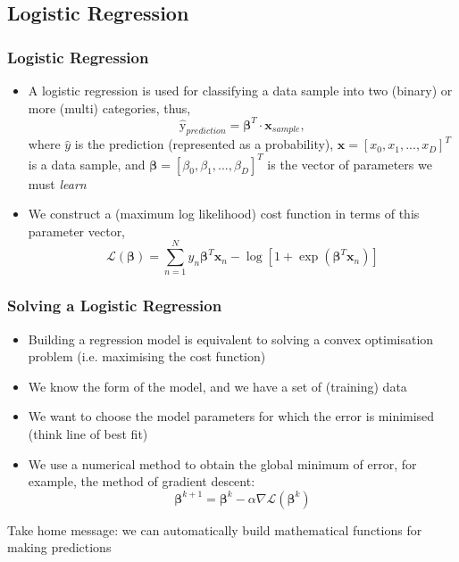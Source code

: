 \documentclass{beamer}
\begin{document}
\subsection{Logistic Regression}
\begin{frame}
\frametitle{Logistic Regression}
\begin{itemize}
\item A logistic regression is used for classifying a data sample into two (binary) or more (multi) categories, thus,
$$\hat{\text{y}}_{prediction} = \boldsymbol\beta^{T} \cdot \boldsymbol{x}_{sample},$$
where $\hat{y}$ is the prediction (represented as a probability), $\boldsymbol{x} = [x_0, x_1, ..., x_D]^T$ is a data sample, and $\boldsymbol\beta = [\beta_0, \beta_1, ..., \beta_D]^T$ is the vector of parameters we must \emph{learn}
\item We construct a (maximum log likelihood) cost function in terms of this parameter vector,
$$\mathcal{L}(\boldsymbol\beta) = \sum_{n=1}^N y_n\boldsymbol\beta^T\boldsymbol{x}_n - \log[1 + \exp(\boldsymbol\beta^T\boldsymbol{x}_n)]$$
\end{itemize}
\end{frame}


\begin{frame}
\frametitle{Solving a Logistic Regression}\begin{itemize}
\item Building a regression model is equivalent to solving a convex optimisation problem (i.e. maximising the cost function)
\item We know the form of the model, and we have a set of (training) data
\item We want to choose the model parameters for which the error is minimised (think line of best fit)
\item We use a numerical method to obtain the global minimum of error, for example, the method of gradient descent:
$$\boldsymbol\beta^{k+1} = \boldsymbol\beta^{k} - \alpha\nabla\mathcal{L}(\boldsymbol\beta^{k})$$
\end{itemize}
Take home message: we can automatically build mathematical functions for making predictions
\end{frame}

\end{document}
